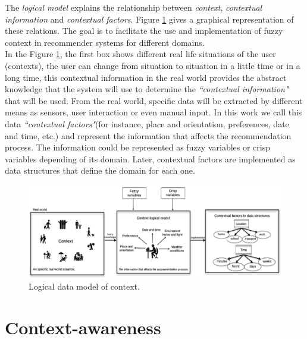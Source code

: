 The \textit{logical model} explains the relationship between \textit{context},
\textit{contextual information} and \textit{contextual factors}. 
Figure \ref{fig:logicalmodel} gives a graphical representation of these relations. 
The goal is to facilitate the use and implementation of fuzzy context 
in recommender systems for different domains.\\
In the Figure \ref{fig:logicalmodel}, the first box shows different
real life situations of the user (contexts), the user can change from situation
to situation in a little time or in a long time, this 
contextual information in the real world provides the abstract knowledge that
the system will use to determine the \textit{``contextual information"} that will 
be used. 
From the real world, specific data will be extracted by different means as
sensors, user interaction or even manual input. In this work 
we call this data \textit{``contextual factors"}(for instance, place and
orientation, preferences, date and time, etc.) and represent the
information that affects the recommendation process. The information
could be represented as fuzzy variables or crisp variables depending of
its domain. Later, contextual factors are implemented as data
structures that define the domain for each one. 
\begin{figure}
\captionsetup{font=footnotesize} \centering
\includegraphics[width=1.0\textwidth]{img/context-scheme.png}  
\small
\caption{Logical data model of context.}
\label{fig:logicalmodel}    
\end{figure} %

\section{Context-awareness} \label{context-awareness}


